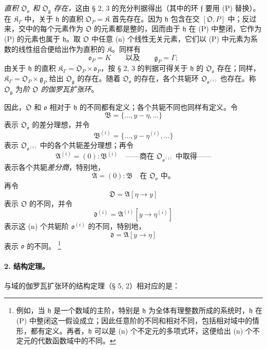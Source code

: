 \documentclass[11pt]{article}
\providecommand{\srcfn}[2]{%
  \begingroup
  \renewcommand{\thefootnote}{#1}%
  \footnote{#2}%
  \addtocounter{footnote}{-1}%
  \endgroup}
\begin{document}
\emph{直积 \(\mathfrak O_{\mathfrak o}\) 和 \(\mathfrak O_{\mathfrak g}\) 存在，}这由 § 2, 3 的充分判据得出（其中的环 \(\mathfrak f\) 要用 (P) 替换）。在 \(\mathfrak K_\Gamma\) 中，关于 \(\mathfrak h\) 的直积 \(\mathfrak O_P=\mathfrak K\) 首先存在。因为 \(\mathfrak h\) 包含在交 \([\mathfrak O,P]\) 中；反过来，交中的每个元素作为 \(\mathfrak O\) 的元素都是整的，因而由于 \(\mathfrak h\) 在 (P) 中整闭，它作为 (P) 的元素也属于 \(\mathfrak h\)。取 \(\mathfrak O\) 中任意 (n) 个线性无关元素，它们以 (P) 中元素为系数的线性组合便给出作为直积的 \(\mathfrak K\)。同样有
\[
\mathfrak o_P=K
\qquad\text{以及}\qquad
\mathfrak g_P=\Gamma;
\]
由关于 \(\mathfrak h\) 的直积 \(\mathfrak K_\Gamma=\mathfrak O_P\times\mathfrak o_P\)，按 § 2, 3 的判据可得关于 \(\mathfrak h\) 的 \(\mathfrak O_{\mathfrak o}\) 存在；同样，\(\mathfrak K_\Gamma=\mathfrak O_P\times\mathfrak g_P\) 给出 \(\mathfrak O_{\mathfrak g}\) 的存在。随着 \(\mathfrak O_{\mathfrak o}\) 的存在，各个共轭环 \(\mathfrak O_{\mathfrak o^{(i)}}\) 也存在。称 \(\mathfrak O_{\mathfrak g}\) 为\emph{阶 \(\mathfrak O\) 的伽罗瓦扩张环}。

因此，\(\mathfrak O\) 和 \(\mathfrak o\) 相对于 \(\mathfrak h\) 的不同都有定义；各个共轭不同也同样有定义。令
\[
\mathfrak B=\{\ldots,y-\eta,\ldots\}
\]
表示 \(\mathfrak O_{\mathfrak o}\) 的差分理想，并令
\[
\mathfrak B^{(i)}=\{\ldots,y-\eta^{(i)},\ldots\}
\]
表示 \(\mathfrak O_{\mathfrak o^{(i)}}\) 中的各个共轭差分理想；再令
\[
\mathfrak A^{(i)}=(0):\mathfrak B^{(i)}
\quad\text{——商在 \(\mathfrak O_{\mathfrak o^{(i)}}\) 中取得——}
\]
表示各个共轭\emph{差分商}，特别地，
\[
\mathfrak A=(0):\mathfrak B\quad\text{在 }\mathfrak O_{\mathfrak o}\text{ 中。}
\]
再令
\[
\mathfrak D=\mathfrak A[\eta\to y]
\]
表示 \(\mathfrak O\) 的不同，并令
\[
\mathfrak d^{(i)}=\mathfrak A^{(i)}[y\to\eta^{(i)}]
\]
表示这 (n) 个共轭阶 \(\mathfrak o^{(i)}\) 的不同，特别地，
\[
\mathfrak d=\mathfrak A[y\to\eta]
\]
表示 \(\mathfrak o\) 的不同。\srcfn{21)}{例如，当 \(\mathfrak h\) 是一个数域的主阶，特别是 \(\mathfrak h\) 为全体有理整数所成的系统时，\(\mathfrak h\) 在 (P) 中整闭这一假设成立；因此任意阶的不同和相对不同，包括相对域中的情形，都有定义。再者，\(\mathfrak h\) 可以是 (n) 个不定元的多项式环，这便给出 (n) 个不定元的代数函数域中的不同。}

\paragraph{2. 结构定理。}
与域的伽罗瓦扩张环的结构定理（§ 5, 2）相对应的是：
\end{document}
